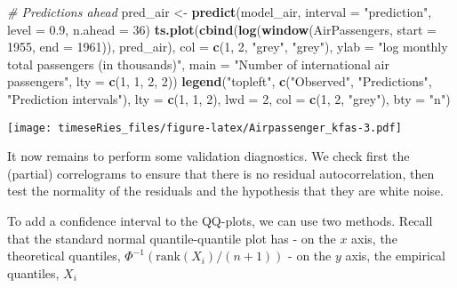 \documentclass[]{book}
\newenvironment{Shaded}{\begin{snugshade}}{\end{snugshade}}
\newcommand{\KeywordTok}[1]{\textcolor[rgb]{0.13,0.29,0.53}{\textbf{#1}}}
\newcommand{\DataTypeTok}[1]{\textcolor[rgb]{0.13,0.29,0.53}{#1}}
\newcommand{\DecValTok}[1]{\textcolor[rgb]{0.00,0.00,0.81}{#1}}
\newcommand{\FloatTok}[1]{\textcolor[rgb]{0.00,0.00,0.81}{#1}}
\newcommand{\StringTok}[1]{\textcolor[rgb]{0.31,0.60,0.02}{#1}}
\newcommand{\CommentTok}[1]{\textcolor[rgb]{0.56,0.35,0.01}{\textit{#1}}}
\newcommand{\NormalTok}[1]{#1}
\begin{document}
\begin{Shaded}
\begin{Highlighting}[]
\CommentTok{# Predictions ahead}
\NormalTok{pred_air <-}\StringTok{ }\KeywordTok{predict}\NormalTok{(model_air, }\DataTypeTok{interval =} \StringTok{"prediction"}\NormalTok{, }\DataTypeTok{level =} \FloatTok{0.9}\NormalTok{, }\DataTypeTok{n.ahead =} \DecValTok{36}\NormalTok{)}
\KeywordTok{ts.plot}\NormalTok{(}\KeywordTok{cbind}\NormalTok{(}\KeywordTok{log}\NormalTok{(}\KeywordTok{window}\NormalTok{(AirPassengers, }\DataTypeTok{start =} \DecValTok{1955}\NormalTok{, }\DataTypeTok{end =} \DecValTok{1961}\NormalTok{)), pred_air), }
    \DataTypeTok{col =} \KeywordTok{c}\NormalTok{(}\DecValTok{1}\NormalTok{, }\DecValTok{2}\NormalTok{, }\StringTok{"grey"}\NormalTok{, }\StringTok{"grey"}\NormalTok{), }\DataTypeTok{ylab =} \StringTok{"log monthly total passengers (in thousands)"}\NormalTok{, }
    \DataTypeTok{main =} \StringTok{"Number of international air passengers"}\NormalTok{, }\DataTypeTok{lty =} \KeywordTok{c}\NormalTok{(}\DecValTok{1}\NormalTok{, }\DecValTok{1}\NormalTok{, }\DecValTok{2}\NormalTok{, }\DecValTok{2}\NormalTok{))}
\KeywordTok{legend}\NormalTok{(}\StringTok{"topleft"}\NormalTok{, }\KeywordTok{c}\NormalTok{(}\StringTok{"Observed"}\NormalTok{, }\StringTok{"Predictions"}\NormalTok{, }\StringTok{"Prediction intervals"}\NormalTok{), }\DataTypeTok{lty =} \KeywordTok{c}\NormalTok{(}\DecValTok{1}\NormalTok{, }
    \DecValTok{1}\NormalTok{, }\DecValTok{2}\NormalTok{), }\DataTypeTok{lwd =} \DecValTok{2}\NormalTok{, }\DataTypeTok{col =} \KeywordTok{c}\NormalTok{(}\DecValTok{1}\NormalTok{, }\DecValTok{2}\NormalTok{, }\StringTok{"grey"}\NormalTok{), }\DataTypeTok{bty =} \StringTok{"n"}\NormalTok{)}
\end{Highlighting}
\end{Shaded}

\texttt{[image: timeseRies\_files/figure-latex/Airpassenger\_kfas-3.pdf]}

It now remains to perform some validation diagnostics. We check first
the (partial) correlograms to ensure that there is no residual
autocorrelation, then test the normality of the residuals and the
hypothesis that they are white noise.

To add a confidence interval to the QQ-plots, we can use two methods.
Recall that the standard normal quantile-quantile plot has - on the
\(x\) axis, the theoretical quantiles,
\(\Phi^{-1}(\mathrm{rank}(X_i)/(n+1))\) - on the \(y\) axis, the
empirical quantiles, \(X_i\)
\end{document}
